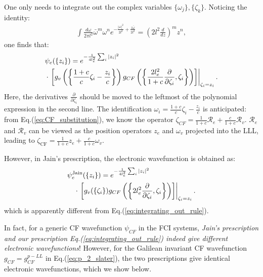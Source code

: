 One only needs to integrate out the complex variables $\{\omega_j\},\{\zeta_k\}$. Noticing the identity:
\begin{align}
    \int \frac{d\omega}{2\pi l^2} \bar\omega^m \omega^n  e^{-\frac{|\omega|^2}{2l^2}+\frac{z\bar\omega}{2l^2}}=\left(2l^2\frac{d}{dz}\right)^m z^n,
\end{align}
one finds that:
\begin{align}
     & \psi_e(\{z_i\})=e^{-\frac{1}{4l_e^2}\sum_i |z_i|^2}\notag                                                                                                                                                                                     \\
     & \cdot \left.\left[g_v\left(\left\{\frac{1+c}{c}\zeta_i-\frac{z_i}{c}\right\}\right)g_{CF}\left(\left\{\frac{2l_e^2}{1+c}\frac{\partial}{\partial \zeta_i}, \zeta_i\right\}\right)\right]\right|_{\zeta_i=z_i}.\label{eq:integrating_out_rule}
\end{align}
Here, the derivatives $\frac{\partial}{\partial \zeta_i}$ should be moved to the leftmost of the polynomial expression in the second line. The identification $\omega_i=\frac{1+c}{c}\zeta_i-\frac{z_i}{c}$ is anticipated: from Eq.(\ref{eq:CF_substitution}), we know the operator $\zeta_{CF}=\frac{1}{1+c}\mathcal R_e+\frac{c}{1+c}\mathcal R_v$. $\mathcal R_e$ and $\mathcal R_v$ can be viewed as the position operators $z_e$ and $\omega_v$ projected into the LLL, leading to $\zeta_{\text{CF}}=\frac{1}{1+c} z_e +\frac{c}{1+c}\omega_v$.

However, in Jain's prescription, the electronic wavefunction is obtained as:
\begin{align}
     & \psi^{\text{Jain}}_e(\{z_i\})=e^{-\frac{1}{4l_e^2}\sum_i |z_i|^2}\notag                                                                                                                    \\
     & \quad\cdot \left.\left[g_v(\{\zeta_i\})g_{CF}\left(\left\{2l_e^2\frac{\partial}{\partial \zeta_i}, \zeta_i\right\}\right)\right]\right|_{\zeta_i=z_i}.\label{eq:integrating_out_rule_Jain}
\end{align}
which is apparently different from Eq.(\ref{eq:integrating_out_rule}).

In fact, for a generic CF wavefunction $\psi_{CF}$ in the FCI systems, \emph{Jain's prescription and our prescription Eq.(\ref{eq:integrating_out_rule}) indeed give different electronic wavefunctions}! However, for the Galilean invariant CF wavefunction $g_{CF}=g_{CF}^{p-LL}$ in Eq.(\ref{eq:p_2_slater}), the two prescriptions give identical electronic wavefunctions, which we show below.

